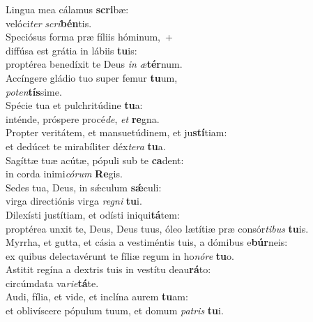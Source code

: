 \evenverse Lingua mea cálamus \textbf{scri}bæ:~\*\\
\evenverse velóci\textit{ter} \textit{scri}\textbf{bén}tis.\\
\oddverse Speciósus forma præ fíliis hóminum,~+\\
\oddverse  diffúsa est grátia in lábiis \textbf{tu}is:~\*\\
\oddverse proptérea benedíxit te Deus \textit{in} \textit{æ}\textbf{tér}num.\\
\evenverse Accíngere gládio tuo super femur \textbf{tu}um,~\*\\
\evenverse \textit{po}\textit{ten}\textbf{tís}sime.\\
\oddverse Spécie tua et pulchritúdine \textbf{tu}a:~\*\\
\oddverse inténde, próspere procé\textit{de}, \textit{et} \textbf{re}gna.\\
\evenverse Propter veritátem, et mansuetúdinem, et ju\textbf{stí}tiam:~\*\\
\evenverse et dedúcet te mirabíliter déx\textit{te}\textit{ra} \textbf{tu}a.\\
\oddverse Sagíttæ tuæ acútæ, pópuli sub te \textbf{ca}dent:~\*\\
\oddverse in corda inimi\textit{có}\textit{rum} \textbf{Re}gis.\\
\evenverse Sedes tua, Deus, in sǽculum \textbf{sǽ}culi:~\*\\
\evenverse virga directiónis virga \textit{re}\textit{gni} \textbf{tu}i.\\
\oddverse Dilexísti justítiam, et odísti iniqui\textbf{tá}tem:~\*\\
\oddverse proptérea unxit te, Deus, Deus tuus, óleo lætítiæ præ consór\textit{ti}\textit{bus} \textbf{tu}is.\\
\evenverse Myrrha, et gutta, et cásia a vestiméntis tuis, a dómibus e\textbf{búr}neis:~\*\\
\evenverse ex quibus delectavérunt te fíliæ regum in ho\textit{nó}\textit{re} \textbf{tu}o.\\
\oddverse Astitit regína a dextris tuis in vestítu deau\textbf{rá}to:~\*\\
\oddverse circúmdata va\textit{ri}\textit{e}\textbf{tá}te.\\
\evenverse Audi, fília, et vide, et inclína aurem \textbf{tu}am:~\*\\
\evenverse et oblivíscere pópulum tuum, et domum \textit{pa}\textit{tris} \textbf{tu}i.\\
